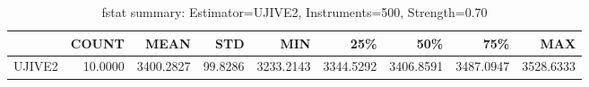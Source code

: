 \begin{table}[ht]
\centering
\caption{fstat summary: Estimator=UJIVE2, Instruments=500, Strength=0.70}
\begin{tabular}{lrrrrrrrr}
\toprule
 & COUNT & MEAN & STD & MIN & 25\% & 50\% & 75\% & MAX \\
\midrule
UJIVE2 & 10.0000 & 3400.2827 & 99.8286 & 3233.2143 & 3344.5292 & 3406.8591 & 3487.0947 & 3528.6333 \\
\bottomrule
\end{tabular}
\end{table}
